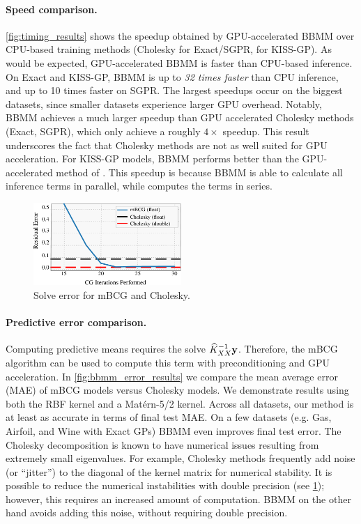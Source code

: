 \paragraph{Speed comparison.}
\cref{fig:timing_results} shows the speedup obtained by GPU-accelerated BBMM over CPU-based training methods (Cholesky for Exact/SGPR, \citet{dong2017scalable} for KISS-GP).
As would be expected, GPU-accelerated BBMM is faster than CPU-based inference.
On Exact and KISS-GP, BBMM is up to \emph{32 times faster} than CPU inference, and up to 10 times faster on SGPR.
The largest speedups occur on the biggest datasets, since smaller datasets experience larger GPU overhead.
Notably, BBMM achieves a much larger speedup than GPU accelerated Cholesky methods (Exact, SGPR), which only achieve a roughly $4\times$ speedup.
This result underscores the fact that Cholesky methods are not as well suited for GPU acceleration.
For KISS-GP models, BBMM performs better than the GPU-accelerated method of \citet{dong2017scalable}.
This speedup is because BBMM is able to calculate all inference terms in parallel, while \citet{dong2017scalable} computes the terms in series.

\begin{figure}[t!]
  \begin{center}
    \includegraphics[width=0.50\textwidth]{figures/cg_error}
  \end{center}
  \caption{Solve error for mBCG and Cholesky. \label{fig:cg_error}}
\end{figure}

\paragraph{Predictive error comparison.}
Computing predictive means requires the solve $\widehat{K}_{XX}^{-1} \mathbf{y}$.
Therefore, the mBCG algorithm can be used to compute this term with preconditioning and GPU acceleration.
In \cref{fig:bbmm_error_results} we compare the mean average error (MAE) of mBCG models versus Cholesky models.
We demonstrate results using both the RBF kernel and a Mat\'ern-5/2 kernel.
Across all datasets, our method is at least as accurate in terms of final test MAE.
On a few datasets (e.g. Gas, Airfoil, and Wine with Exact GPs) BBMM even improves final test error.
The Cholesky decomposition is known to have numerical issues resulting from extremely small eigenvalues.
For example, Cholesky methods frequently add noise (or ``jitter'') to the diagonal of the kernel matrix for numerical stability.
It is possible to reduce the numerical instabilities with double precision (see \cref{fig:cg_error}); however, this requires an increased amount of computation.
BBMM on the other hand avoids adding this noise, without requiring double precision.

